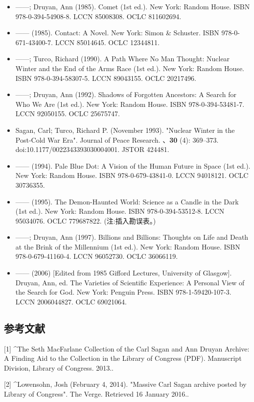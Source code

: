 \begin{itemize}
\item ——; Druyan, Ann (1985). Comet (1st ed.). New York: Random House. ISBN 978-0-394-54908-8. LCCN 85008308. OCLC 811602694.
\item —— (1985). Contact: A Novel. New York: Simon & Schuster. ISBN 978-0-671-43400-7. LCCN 85014645. OCLC 12344811.
\item ——; Turco, Richard (1990). A Path Where No Man Thought: Nuclear Winter and the End of the Arms Race (1st ed.). New York: Random House. ISBN 978-0-394-58307-5. LCCN 89043155. OCLC 20217496.
\item ——; Druyan, Ann (1992). Shadows of Forgotten Ancestors: A Search for Who We Are (1st ed.). New York: Random House. ISBN 978-0-394-53481-7. LCCN 92050155. OCLC 25675747.
\item Sagan, Carl; Turco, Richard P. (November 1993). "Nuclear Winter in the Post-Cold War Era". Journal of Peace Research. 、\textbf{30} (4): 369–373. doi:10.1177/0022343393030004001. JSTOR 424481.
\item —— (1994). Pale Blue Dot: A Vision of the Human Future in Space (1st ed.). New York: Random House. ISBN 978-0-679-43841-0. LCCN 94018121. OCLC 30736355.
\item —— (1995). The Demon-Haunted World: Science as a Candle in the Dark (1st ed.). New York: Random House. ISBN 978-0-394-53512-8. LCCN 95034076. OCLC 779687822. (注:插入勘误表。)
\item ——; Druyan, Ann (1997). Billions and Billions: Thoughts on Life and Death at the Brink of the Millennium (1st ed.). New York: Random House. ISBN 978-0-679-41160-4. LCCN 96052730. OCLC 36066119.
\item —— (2006) [Edited from 1985 Gifford Lectures, University of Glasgow]. Druyan, Ann, ed. The Varieties of Scientific Experience: A Personal View of the Search for God. New York: Penguin Press. ISBN 978-1-59420-107-3. LCCN 2006044827. OCLC 69021064.
\end{itemize}

\subsection{参考文献}
[1]
^The Seth MacFarlane Collection of the Carl Sagan and Ann Druyan Archive: A Finding Aid to the Collection in the Library of Congress (PDF). Manuscript Division, Library of Congress. 2013..

[2]
^Lowensohn, Josh (February 4, 2014). "Massive Carl Sagan archive posted by Library of Congress". The Verge. Retrieved 16 January 2016..

